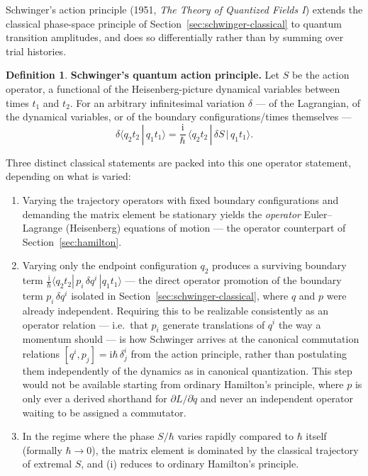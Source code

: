 \documentclass[11pt]{book}
\theoremstyle{definition}
\newtheorem{definition}{Definition}[section]
\theoremstyle{plain}
\theoremstyle{remark}
\newcommand{\ii}{\mathrm{i}}
\begin{document}
Schwinger's action principle (1951, \emph{The Theory of Quantized Fields I}) extends the classical phase-space principle of Section~\ref{sec:schwinger-classical} to quantum transition amplitudes, and does so differentially rather than by summing over trial histories.

\begin{definition}
\textbf{Schwinger's quantum action principle.} Let $S$ be the action operator, a functional of the Heisenberg-picture dynamical variables between times $t_1$ and $t_2$. For an arbitrary infinitesimal variation $\delta$ --- of the Lagrangian, of the dynamical variables, or of the boundary configurations/times themselves ---
\[
\delta \langle q_2 t_2 \,|\, q_1 t_1\rangle = \frac{\ii}{\hbar}\,\langle q_2 t_2\,|\,\delta S\,|\,q_1 t_1\rangle .
\]
\end{definition}

Three distinct classical statements are packed into this one operator statement, depending on what is varied:
\begin{enumerate}[label=(\roman*)]
\item Varying the trajectory operators with fixed boundary configurations and demanding the matrix element be stationary yields the \emph{operator} Euler--Lagrange (Heisenberg) equations of motion --- the operator counterpart of Section~\ref{sec:hamilton}.
\item Varying only the endpoint configuration $q_2$ produces a surviving boundary term $\tfrac{\ii}{\hbar}\langle q_2t_2|\,p_i\,\delta q^i\,|q_1t_1\rangle$ --- the direct operator promotion of the boundary term $p_i\,\delta q^i$ isolated in Section~\ref{sec:schwinger-classical}, where $q$ and $p$ were already independent. Requiring this to be realizable consistently as an operator relation --- i.e.\ that $p_i$ generate translations of $q^i$ the way a momentum should --- is how Schwinger arrives at the canonical commutation relations $[q^i,p_j]=\ii\hbar\,\delta^i_j$ from the action principle, rather than postulating them independently of the dynamics as in canonical quantization. This step would not be available starting from ordinary Hamilton's principle, where $p$ is only ever a derived shorthand for $\partial L/\partial\dot q$ and never an independent operator waiting to be assigned a commutator.
\item In the regime where the phase $S/\hbar$ varies rapidly compared to $\hbar$ itself (formally $\hbar\to0$), the matrix element is dominated by the classical trajectory of extremal $S$, and (i) reduces to ordinary Hamilton's principle.
\end{enumerate}
\end{document}
